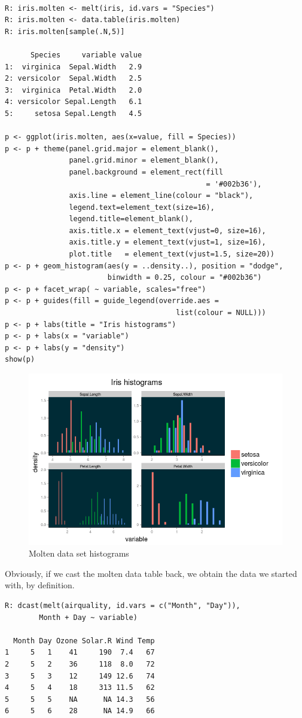 \begin{verbatim}

R: iris.molten <- melt(iris, id.vars = "Species")
R: iris.molten <- data.table(iris.molten)
R: iris.molten[sample(.N,5)]

      Species     variable value
1:  virginica  Sepal.Width   2.9
2: versicolor  Sepal.Width   2.5
3:  virginica  Petal.Width   2.0
4: versicolor Sepal.Length   6.1
5:     setosa Sepal.Length   4.5

p <- ggplot(iris.molten, aes(x=value, fill = Species))
p <- p + theme(panel.grid.major = element_blank(), 
               panel.grid.minor = element_blank(),
               panel.background = element_rect(fill 
                                               = '#002b36'),
               axis.line = element_line(colour = "black"),
               legend.text=element_text(size=16),
               legend.title=element_blank(),
               axis.title.x = element_text(vjust=0, size=16),
               axis.title.y = element_text(vjust=1, size=16),
               plot.title   = element_text(vjust=1.5, size=20)) 
p <- p + geom_histogram(aes(y = ..density..), position = "dodge",
                        binwidth = 0.25, colour = "#002b36")
p <- p + facet_wrap( ~ variable, scales="free")
p <- p + guides(fill = guide_legend(override.aes = 
                                        list(colour = NULL)))
p <- p + labs(title = "Iris histograms")
p <- p + labs(x = "variable")
p <- p + labs(y = "density")
show(p)
\end{verbatim}
\begin{figure}[htbp]
 \centering
 \includegraphics[scale = 0.5]{images/facet_wrap}
 \caption*{Molten data set histograms}
\end{figure}
Obviously, if we cast the molten data table 
back, we obtain the data we started with,
by definition.

\begin{verbatim}
R: dcast(melt(airquality, id.vars = c("Month", "Day")), 
        Month + Day ~ variable)
        
  Month Day Ozone Solar.R Wind Temp
1     5   1    41     190  7.4   67
2     5   2    36     118  8.0   72
3     5   3    12     149 12.6   74
4     5   4    18     313 11.5   62
5     5   5    NA      NA 14.3   56
6     5   6    28      NA 14.9   66        
\end{verbatim}




